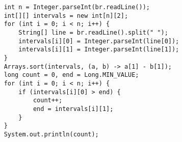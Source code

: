 \documentclass{article}
\begin{document}
\begin{verbatim}
    int n = Integer.parseInt(br.readLine());
    int[][] intervals = new int[n][2];
    for (int i = 0; i < n; i++) {
        String[] line = br.readLine().split(" ");
        intervals[i][0] = Integer.parseInt(line[0]);
        intervals[i][1] = Integer.parseInt(line[1]);
    }
    Arrays.sort(intervals, (a, b) -> a[1] - b[1]);
    long count = 0, end = Long.MIN_VALUE;
    for (int i = 0; i < n; i++) {
        if (intervals[i][0] > end) {
            count++;
            end = intervals[i][1];
        }
    }
    System.out.println(count);
\end{verbatim}
\end{document}
